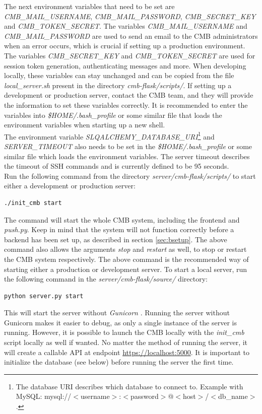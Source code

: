 The next environment variables that need to be set are \textit{CMB\_MAIL\_USERNAME}, \textit{CMB\_MAIL\_PASSWORD}, \textit{CMB\_SECRET\_KEY} and \textit{CMB\_TOKEN\_SECRET}. The variables \textit{CMB\_MAIL\_USERNAME} and \textit{CMB\_MAIL\_PASSWORD} are used to send an email to the CMB administrators when an error occurs, which is crucial if setting up a production environment. The variables \textit{CMB\_SECRET\_KEY} and \textit{CMB\_TOKEN\_SECRET} are used for session token generation, authenticating messages and more.  When developing locally, these variables can stay unchanged and can be copied from the file \textit{local\_server.sh} present in the directory \textit{cmb-flask/scripts/}. If setting up a development or production server, contact the CMB team, and they will provide the information to set these variables correctly. It is recommended to enter the variables into \textit{\$HOME/.bash\_profile} or some similar file that loads the environment variables when starting up a new shell. \\

The environment variable \textit{SLQALCHEMY\_DATABASE\_URI}\footnote{The database URI describes which database to connect to. Example with MySQL: mysql://$<$username$>$:$<$password$>$@$<$host$>$/$<$db\_name$>$.} and \textit{SERVER\_TIMEOUT} also needs to be set in the \textit{\$HOME/.bash\_profile} or some similar file which loads the environment variables. The server timeout describes the timeout of SSH commands and is currently defined to be 95 seconds. \\

Run the following command from the directory \textit{server/cmb-flask/scripts/} to start either a development or production server:
\begin{lstlisting}
./init_cmb start
\end{lstlisting}
The command will start the whole CMB system, including the frontend and \textit{push.py}. Keep in mind that the system will not function correctly before a backend has been set up, as described in section \ref{sec:bsetup}. The above command also allows the arguments \textit{stop} and \textit{restart} as well, to stop or restart the CMB system respectively. The above command is the recommended way of starting either a production or development server. To start a local server, run the following command in the \textit{server/cmb-flask/source/} directory:
\begin{lstlisting}
python server.py start
\end{lstlisting}
This will start the server without \textit{Gunicorn} \cite{GUNICORN}. Running the server without Gunicorn makes it easier to debug, as only a single instance of the server is running. However, it is possible to launch the CMB locally with the \textit{init\_cmb} script locally as well if wanted. No matter the method of running the server, it will create a callable API at endpoint \url{https://localhost:5000}. It is important to initialize the database (see below) before running the server the first time. \\

